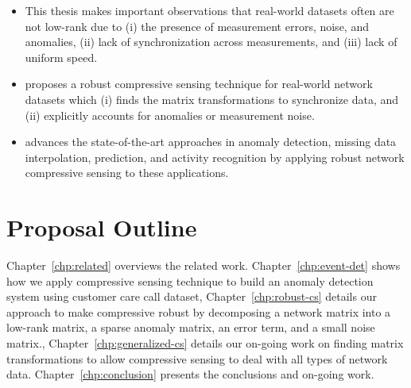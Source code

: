 \begin{itemize}
\item This thesis makes important observations that real-world datasets often are not low-rank due to (i) the presence of measurement errors, noise, and anomalies, (ii) lack of synchronization across measurements, and (iii) lack of uniform speed.

\item proposes a robust compressive sensing technique for real-world network datasets which (i) finds the matrix transformations to synchronize data, and (ii) explicitly accounts for anomalies or measurement noise.

\item advances the state-of-the-art approaches in anomaly detection, missing data interpolation, prediction, and activity recognition by applying robust network compressive sensing to these applications.

\end{itemize}

\section{Proposal Outline}

Chapter~\ref{chp:related} overviews the related work. Chapter~\ref{chp:event-det} shows how we apply compressive sensing technique to build an anomaly detection system using customer care call dataset, Chapter~\ref{chp:robust-cs} details our approach to make compressive robust by decomposing a network matrix into a low-rank matrix, a sparse anomaly matrix, an error term, and a small noise matrix., Chapter~\ref{chp:generalized-cs} details our on-going work on finding matrix transformations to allow compressive sensing to deal with all types of network data. Chapter~\ref{chp:conclusion} presents the conclusions and on-going work.


